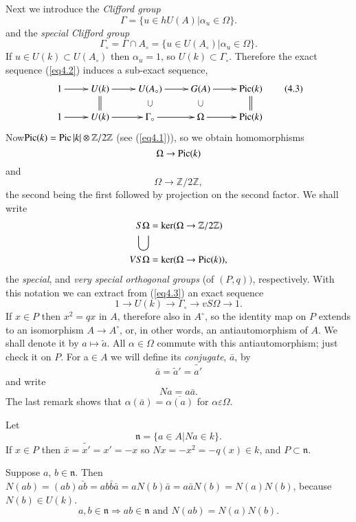 Next we introduce the \textit{Clifford group} 
$$
\Gamma = \{u \in h U (A) | \alpha_u \in \Omega \}.  
$$
and the \textit{special Clifford group}
$$
\Gamma_\circ = \Gamma \cap A_\circ = \{u \in U(A_\circ)\big| \alpha_u
\in \Omega\}.  
$$
If $u \in U (k) \subset U(A_\circ)$ then $\alpha_u = 1$, so $U(k)
\subset \Gamma_\circ$. Therefore the exact sequence (\ref{eq4.2})
induces a sub-exact sequence,   
\[
\xymatrix@R=0.5cm{
1 \ar[r] & U(k) \ar[r] \ar@{=}[d] & U(A_\circ) \ar[r]
\ar@{}[d]|{\bigcup} & G(A) \ar[r] \ar@{}[d]|{\bigcup} & \Pic (k)
\ar@{=}[d]\\ 
1 \ar[r] & U(k) \ar[r] & \Gamma_\circ \ar[r] & \Omega \ar[r] & \Pic
(k)  
}\tag{4.3}\label{eq4.3}
\]
 Now\pageoriginale $\operatorname{Pic} (k) = \operatorname{Pic} |k| \otimes \mathbb{Z}/2
 \mathbb{Z}$ (see (\ref{eq4.1})), so we obtain homomorphisms  
 $$
 \Omega \rightarrow \operatorname{Pic} (k) 
 $$
 and 
 $$
 \Omega \rightarrow \mathbb{Z}/2 \mathbb{Z}, 
 $$
 the second being the first followed by projection on the second
 factor. We shall write  
 \begin{align*}
S \Omega & = \ker (\Omega \to \mathbb{Z}/2 \mathbb{Z})\\
\bigcup & \\
VS \Omega & = \ker (\Omega \to \operatorname{Pic} (k)),
 \end{align*} 
 the \textit{special}, and \textit{very special orthogonal groups}
 (of $(P,q))$, respectively. With this notation we can extract from
 (\ref{eq4.3}) an exact sequence 
 \begin{equation*}
1 \to U(k) \to \Gamma_\circ \to vS \Omega \to 1. \tag{4.4}\label{eq4.4}
 \end{equation*} 
 If $x \in P$ then $x^2 = qx $ in $A$, therefore also in
 $A^\circ$, so the identity map on $P$ extends to an isomorphism $A \to
 A^\circ$, or, in other words, an antiautomorphism of $A$. We shall denote
 it by $a \mapsto \tilde{a}$. All $\alpha \in \Omega$ commute
 with this antiautomorphism; just check it on $P$. For a$\in A$ we
 will define its \textit{conjugate}, $\bar{a}$, by  
 $$
 \bar{a} = \tilde{a}' = \tilde{a'}
 $$ 
 and write 
 $$
 Na= a\bar{a}.
 $$
 The last remark shows that $\alpha (\bar{a}) = \overline{\alpha(a)}$
 for $\alpha \varepsilon\Omega$. 

 Let\pageoriginale 
 $$
 \mathfrak{n} = \{a \in A \big| Na \in k \}.
 $$
 If $x \in P$ then $\bar{x}=\tilde{x'}=x'=-x $ so $Nx = - x^2 = -q(x)
 \in k$, and $P\subset \mathfrak{n}$. 
 
 Suppose $a$, $b \in \mathfrak{n}$. Then $N(ab) = (ab)\bar{ab}=
 ab\bar{b}\bar{a} = aN(b)\bar{a} = a \bar{a}N(b) = N(a)N(b)$, because
 $N(b) \in U(k)$. 
$$
 a,b \in \mathfrak{n} \Rightarrow ab \in \mathfrak{n}
 \text{ and } N(ab) =  N(a) N(b). 
$$
 
